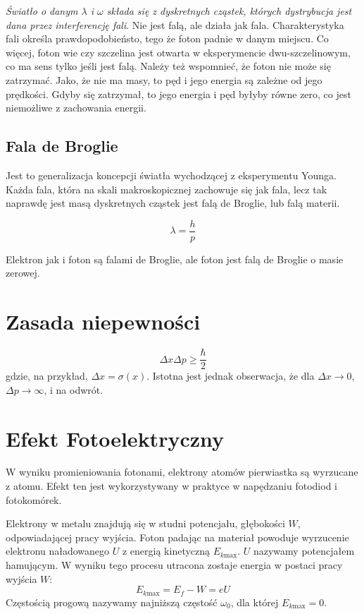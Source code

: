 \documentclass{../notatki}
\begin{document}
\noindent \textit{Światło o danym $\lambda$ i $\omega$ składa się z
dyskretnych cząstek, których dystrybucja jest dana przez interferencję fali}.
Nie jest falą, ale działa jak fala. Charakterystyka fali określa
prawdopodobieństo, tego że foton padnie w danym miejscu.
Co więcej, foton wie czy szczelina jest otwarta w eksperymencie
dwu-szczelinowym, co ma sens tylko jeśli jest falą.
Należy też wspomnieć, że foton nie może się zatrzymać. Jako, że nie ma masy,
to pęd i jego energia są zależne od jego prędkości. Gdyby się
zatrzymał, to jego energia i pęd byłyby równe zero, co jest
niemożliwe z zachowania energii.

\subsection{Fala de Broglie}

Jest to generalizacja koncepcji światła wychodzącej z eksperymentu Younga.
Każda fala, która na skali makroskopicznej zachowuje się jak fala, lecz tak
naprawdę jest masą dyskretnych cząstek jest falą de Broglie, lub falą materii.

$$
\lambda = \frac{h}{p}
$$

Elektron jak i foton są falami de Broglie, ale foton jest falą de
Broglie o masie zerowej.

\section{Zasada niepewności}

$$
\Delta x \Delta p \geq \frac{\hbar}{2}
$$
gdzie, na przykład, $\Delta x = \sigma(x)$. Istotna jest jednak obserwacja, że
dla $\Delta x \rightarrow 0$, $\Delta p \rightarrow \infty$, i na odwrót.

\section{Efekt Fotoelektryczny}

W wyniku promieniowania fotonami, elektrony atomów pierwiastka są
wyrzucane z atomu. Efekt ten jest wykorzystywany w praktyce w
napędzaniu fotodiod i fotokomórek.

Elektrony w metalu znajdują się w studni potencjału, głębokości $W$,
odpowiadającej pracy wyjścia.
Foton padając na materiał powoduje wyrzucenie elektronu naładowanego
$U$ z energią kinetyczną $E_{k \text{max}}$. $U$ nazywamy potencjałem
hamującym. W wyniku tego procesu
utracona zostaje energia w postaci pracy wyjścia $W$:
$$
E_{k \text{max}} = E_f - W = eU
$$
Częstością progową nazywamy najniższą częstość $\omega_0$, dla której
$E_{k \text{max}} = 0$.
\end{document}
